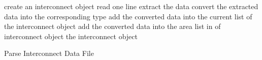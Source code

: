 \setlength{\textfloatsep}{0.2cm}
\begin{algorithm2e}[H]
		create an interconnect object\;
		{
			read one line\;
			{
				extract the data\;
				convert the extracted data into the corresponding type\;
				{
					add the converted data into the current list of the interconnect object\;
				}
				{
					add the converted data into the area list in of interconnect object\;
				}
			}
		}
		\Return the interconnect object\;
	\caption{Parse Interconnect Data File}
	\label{algo:ic_parser}
\end{algorithm2e}
\setlength{\textfloatsep}{0.2cm}